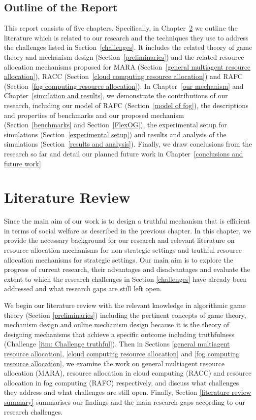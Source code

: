\documentclass[11pt]{phdthesis}
\begin{document}
\section{Outline of the Report} \label{outline}
This report consists of five chapters. Specifically, in Chapter~\ref{literature review} we outline the literature which is related to our research and the techniques they use to address the challenges listed in Section~\ref{challenges}. It includes the related theory of game theory and mechanism design (Section~\ref{preliminaries}) and the related resource allocation mechanisms proposed for MARA (Section~\ref{general multiagent resource allocation}), RACC (Section~\ref{cloud computing resource allocation}) and RAFC (Section~\ref{fog computing resource allocation}). In Chapter~\ref{our mechanism} and Chapter~\ref{simulation and results}, we demonstrate the contributions of our research, including our model of RAFC (Section~\ref{model of fog}), the descriptions and properties of benchmarks and our proposed mechanism (Section~\ref{benchmarks} and Section~\ref{FlexOG}), the experimental setup for simulations (Section~\ref{experimental setup}) and results and analysis of the simulations (Section~\ref{results and analysis}). Finally, we draw conclusions from the research so far and detail our planned future work in Chapter~\ref{conclusions and future work}


\chapter{Literature Review} \label{literature review}

Since the main aim of our work is to design a truthful mechanism that is efficient in terms of social welfare as described in the previous chapter. In this chapter, we provide the necessary background for our research and relevant literature on resource allocation mechanisms for non-strategic settings and truthful resource allocation mechanisms for strategic settings. Our main aim is to explore the progress of current research, their advantages and disadvantages and evaluate the extent to which the research challenges in Section \ref{challenges} have already been addressed and what research gaps are still left open.

We begin our literature review with the relevant knowledge in algorithmic game theory (Section \ref{preliminaries}) including the pertinent concepts of game theory, mechanism design and online mechanism design because it is the theory of designing mechanisms that achieve a specific outcome including truthfulness (Challenge \ref{itm: Challenge truthful}). Then in Sections \ref{general multiagent resource allocation}, \ref{cloud computing resource allocation} and \ref{fog computing resource allocation}, we examine the work on general multiagent resource allocation (MARA), resource allocation in cloud computing (RACC) and resource allocation in fog computing (RAFC) respectively, and discuss what challenges they address and what challenges are still open. Finally, Section \ref{literature review summary} summarises our findings and the main research gaps according to our research challenges.
\end{document}
